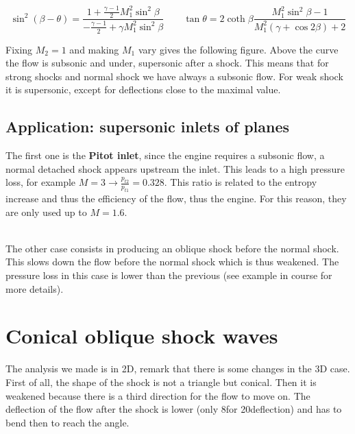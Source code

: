 	\begin{equation}
	\sin ^2 (\beta - \theta) = \frac{1 + \frac{\gamma -1}{2} M_1^2 \sin ^2 \beta}{-\frac{\gamma - 1}{2}+ \gamma M_1^2 \sin ^2 \beta}\qquad  \tan \theta = 2 \coth \beta \frac{M_1^2\sin ^2 \beta -1}{M_1^2 (\gamma + \cos 2\beta ) +2}
	\end{equation}
	
	Fixing $M_2=1$ and making $M_1$ vary gives the following figure. Above the curve the flow is subsonic and under, supersonic after a shock. This means that for strong shocks and normal shock we have always a subsonic flow. For weak shock it is supersonic, except for deflections close to the maximal value. 
	
\subsection{Application: supersonic inlets of planes}
	The first one is the \textbf{Pitot inlet}, since the engine requires a subsonic flow, a normal detached shock appears upstream the inlet. This leads to a high pressure loss, for example $M=3 \rightarrow \frac{p_{t2}}{p_{t1}} = 0.328$. This ratio is related to the entropy increase and thus the efficiency of the flow, thus the engine. For this reason, they are only used up to $M = 1.6$. 
	
	\ \\
	
	The other case consists in producing an oblique shock before the normal shock. This slows down the flow before the normal shock which is thus weakened. The pressure loss in this case is lower than the previous (see example in course for more details).
	
\section{Conical oblique shock waves}
	The analysis we made is in 2D, remark that there is some changes in the 3D case. First of all, the shape of the shock is not a triangle but conical. Then it is weakened because there is a third direction for the flow to move on. The deflection of the flow after the shock is lower (only 8\degres for 20\degres deflection) and has to bend then to reach the angle. 